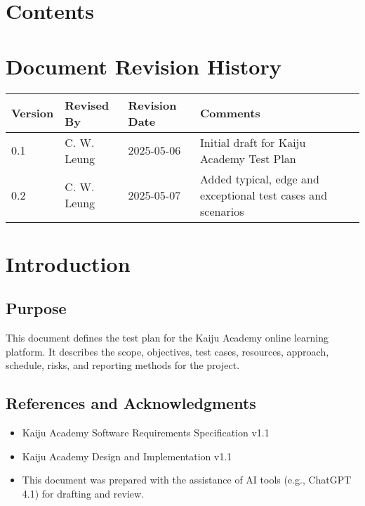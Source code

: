 \documentclass[a4paper,11pt]{scrartcl}
\begin{document}
\section*{Contents}
\tableofcontents
\clearpage

\section*{Document Revision History}
\begin{center}
\begin{tabularx}{\textwidth}{l l l X}
\toprule
Version & Revised By & Revision Date & Comments \\
\midrule
0.1 & C. W. Leung & 2025-05-06 & Initial draft for Kaiju Academy Test Plan \\
0.2 & C. W. Leung & 2025-05-07 & Added typical, edge and exceptional test cases and scenarios \\
\bottomrule

\end{tabularx}
\end{center}

\clearpage
{}


\section{Introduction}

\subsection{Purpose}
This document defines the test plan for the Kaiju Academy online learning platform. It describes the scope, objectives, test cases, resources, approach, schedule, risks, and reporting methods for the project.

\subsection{References and Acknowledgments}
\begin{itemize}[leftmargin=*]
    \item Kaiju Academy Software Requirements Specification v1.1
    \item Kaiju Academy Design and Implementation v1.1
    \item This document was prepared with the assistance of AI tools (e.g., ChatGPT 4.1) for drafting and review.
\end{itemize}
\end{document}
